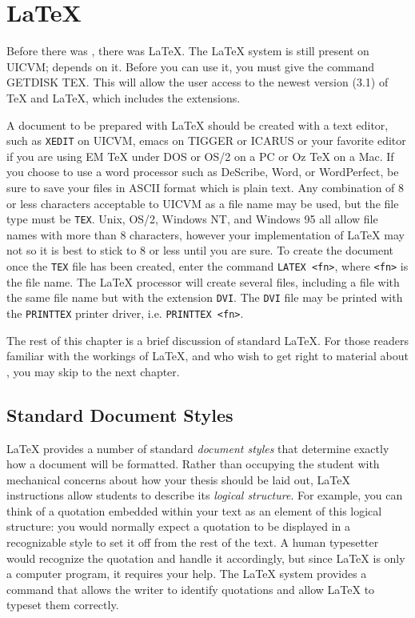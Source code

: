 
\chapter{\LaTeX{}}\label{sec:styles}
Before there was \uicthesi{}, there was \LaTeX{}.
The \LaTeX{} system is still present on UICVM; \uicthesi{}
depends on it.
Before you can use it, you must give the command GETDISK TEX.
This will allow the user access to the newest version (3.1) of
\TeX{} and \LaTeX{}, which includes the \ams{} extensions.
 
A document to be prepared with \LaTeX{} should be created
with a text editor, such as {\tt XEDIT} on UICVM, {\ttfamily
 emacs} on TIGGER or ICARUS or your favorite editor if you are
using EM \TeX{} under DOS or OS/2 on a PC or Oz \TeX{} on a Mac.
If you choose to use a word processor such as DeScribe, Word, or
WordPerfect, be sure to save your files in ASCII format which is
plain text.
Any combination of 8 or less characters acceptable to UICVM as
a file name may be used, but the file type must be {\tt TEX}. Unix,
OS/2, Windows NT, and Windows 95 all allow file names with more
than 8 characters, however your implementation of \LaTeX{} may not
so it is best to stick to 8 or less until you are sure.
To create the document once the {\tt TEX} file has been created,
enter the command \verb+LATEX <fn>+, where \verb+<fn>+ is the
file name.  The \LaTeX{} processor will create several files,
including a file with the same file name but with the extension
\verb+DVI+.  The \verb+DVI+ file may be printed with the
\verb+PRINTTEX+ printer driver, i.e.{} \verb+PRINTTEX <fn>+.
 
The rest of this chapter is a brief discussion of standard \LaTeX{}.
For those readers familiar with the workings of \LaTeX{}, and
who wish to get right to material about \uicthesi{}, you may
skip to the next chapter.
 
\section{Standard Document Styles}
\LaTeX{} provides a number of standard {\em document styles\/}
that determine exactly how a document will be formatted.
Rather than occupying the student with mechanical concerns about
how your thesis should be laid out, \LaTeX{} instructions allow students
to describe its {\em logical structure\/}.
For example, you can think of a quotation embedded within your
text as an element of this logical structure: you would normally expect
a quotation to be displayed in a recognizable style to set it
off from the rest of the text.
A human typesetter would recognize the quotation and handle
it accordingly, but since \LaTeX{} is only a computer program,
it requires your help.
The \LaTeX{} system provides a command that allows the writer to
identify quotations and allow \LaTeX{} to typeset them correctly.
 
